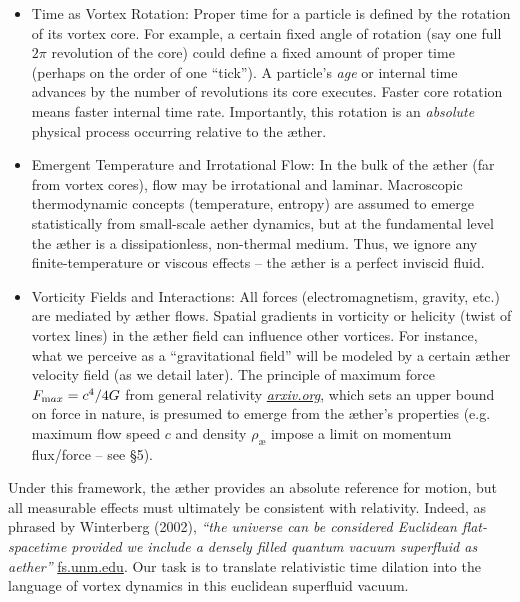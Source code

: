 \documentclass[aps,preprint,superscriptaddress]{revtex4}
\begin{document}
\begin{itemize}
        \item
        Time as Vortex Rotation: Proper time for a particle is defined by the rotation of its vortex core. For example, a certain fixed angle of rotation (say one full $2\pi$ revolution of the core) could define a fixed amount of proper time (perhaps on the order of one “tick”). A particle’s \textit{age} or internal time advances by the number of revolutions its core executes. Faster core rotation means faster internal time rate. Importantly, this rotation is an \textit{absolute} physical process occurring relative to the æther.

        \item
        Emergent Temperature and Irrotational Flow: In the bulk of the æther (far from vortex cores), flow may be irrotational and laminar. Macroscopic thermodynamic concepts (temperature, entropy) are assumed to emerge statistically from small-scale aether dynamics, but at the fundamental level the æther is a dissipationless, non-thermal medium. Thus, we ignore any finite-temperature or viscous effects – the æther is a perfect inviscid fluid.

        \item
        Vorticity Fields and Interactions: All forces (electromagnetism, gravity, etc.) are mediated by æther flows. Spatial gradients in vorticity or helicity (twist of vortex lines) in the æther field can influence other vortices. For instance, what we perceive as a “gravitational field” will be modeled by a certain æther velocity field (as we detail later). The principle of maximum force $F_{\textrm max}=c^4/4G$ from general relativity
        \href{https://arxiv.org/abs/2205.06302#:~:text=the%20principle%20of%20maximum%20force,The%20limits%20illuminate}{\textit{arxiv.org}}, which sets an upper bound on force in nature, is presumed to emerge from the æther’s properties (e.g. maximum flow speed $c$ and density $\rho_{\text{\ae}}$ impose a limit on momentum flux/force – see §5).
    \end{itemize}

    Under this framework, the æther provides an absolute reference for motion, but all measurable effects must ultimately be consistent with relativity. Indeed, as phrased by Winterberg (2002), \textit{“the universe can be considered Euclidean flat-spacetime provided we include a densely filled quantum vacuum superfluid as aether”}
    \href{https://fs.unm.edu/QuantizationDiscretization.pdf#:~:text=Winterberg%20,an%20equal%20number%20of%20positive}{fs.unm.edu}. Our task is to translate relativistic time dilation into the language of vortex dynamics in this euclidean superfluid vacuum.
\end{document}
